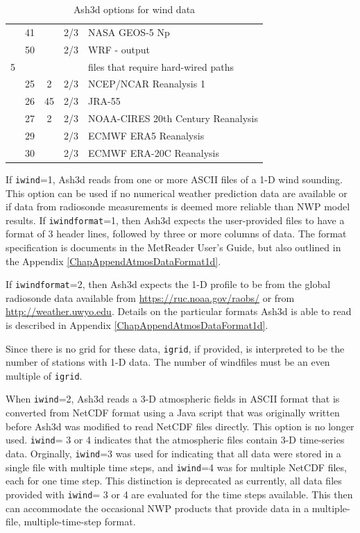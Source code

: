 \begin{table}[htbp]
\begin{center}
\begin{tabular}{| c | c| c | c | l |}
 &41&   &2/3&NASA GEOS-5 Np\\
 &50&   &2/3&WRF - output\\
\hline
5& & & &files that require hard-wired paths \\
\hline
 &25&  2&2/3&NCEP/NCAR Reanalysis 1\\
 &26& 45&2/3&JRA-55\\
 &27&  2&2/3&NOAA-CIRES 20th Century Reanalysis\\
 &29&   &2/3&ECMWF ERA5 Reanalysis\\
 &30&   &2/3&ECMWF ERA-20C Reanalysis\\
\hline
\end{tabular}
\caption{\label{tab:MetOptions}Ash3d options for wind data}
\end{center}
\end{table}
\normalsize

If \texttt{iwind}=1, Ash3d reads from one or more ASCII files of a 1-D wind sounding.
This option can be used if no numerical weather prediction
data are available or if data from radiosonde measurements is deemed more
reliable than NWP model results.
If \texttt{iwindformat}=1, then Ash3d expects the user-provided files to have a format
of 3 header lines, followed by three or more columns of data.  The format specification
is documents in the MetReader User's Guide, but also outlined in the
Appendix \ref{ChapAppendAtmosDataFormat1d}.

If \texttt{iwindformat}=2, then Ash3d expects the 1-D profile to be from the global
radiosonde data available from \url{https://ruc.noaa.gov/raobs/} or from
\url{http://weather.uwyo.edu}.  Details on the particular formats Ash3d is able to
read is described in Appendix \ref{ChapAppendAtmosDataFormat1d}.

Since there is no grid for these data, \texttt{igrid}, if provided, is interpreted to
be the number of stations with 1-D data. The number of windfiles must be an even
multiple of \texttt{igrid}.

When \texttt{iwind}=2, Ash3d reads a 3-D atmospheric fields in ASCII format that is converted from
NetCDF format using a Java script that was originally written before Ash3d was
modified to read NetCDF files directly. This option is no longer used.
\texttt{iwind}= 3 or 4 indicates that the atmospheric files contain 3-D time-series
data.  Orginally, \texttt{iwind}=3 was used for indicating that all data were stored in
a single file with multiple time steps, and \texttt{iwind}=4 was for multiple NetCDF files,
each for one time step.  This distinction is deprecated as currently, all data
files provided with \texttt{iwind}= 3 or 4 are evaluated for the time steps available.
This then can accommodate the occasional NWP products that provide data in a
multiple-file, multiple-time-step format.

